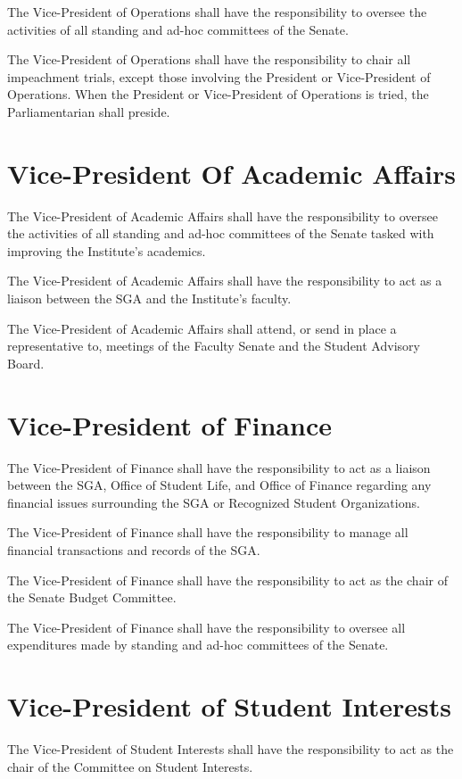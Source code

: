 \documentclass[12pt,oneside]{scrreprt}
\begin{document}
The Vice-President of Operations shall have the responsibility to oversee the activities of all standing and ad-hoc committees of the Senate.

The Vice-President of Operations shall have the responsibility to chair all impeachment trials, except those involving the President or Vice-President of Operations. When the President or Vice-President of Operations is tried, the Parliamentarian shall preside.

\section{Vice-President Of Academic Affairs}
The Vice-President of Academic Affairs shall have the responsibility to oversee the activities of all standing and ad-hoc committees of the Senate tasked with improving the Institute's academics.

The Vice-President of Academic Affairs shall have the responsibility to act as a
liaison between the SGA and the Institute's faculty.

The Vice-President of Academic Affairs shall attend, or send in place a representative to, meetings of the Faculty Senate and the Student Advisory Board.

\section{Vice-President of Finance}
The Vice-President of Finance shall have the responsibility to act as a liaison between the SGA, Office of Student Life, and Office of Finance regarding any financial issues surrounding the SGA or Recognized Student Organizations.

The Vice-President of Finance shall have the responsibility to manage all financial
transactions and records of the SGA.

The Vice-President of Finance shall have the responsibility to act as the chair of the
Senate Budget Committee.

The Vice-President of Finance shall have the responsibility to oversee all expenditures
made by standing and ad-hoc committees of the Senate.

\section{Vice-President of Student Interests}
The Vice-President of Student Interests shall have the responsibility to act as the chair of the Committee on Student Interests.
\end{document}
